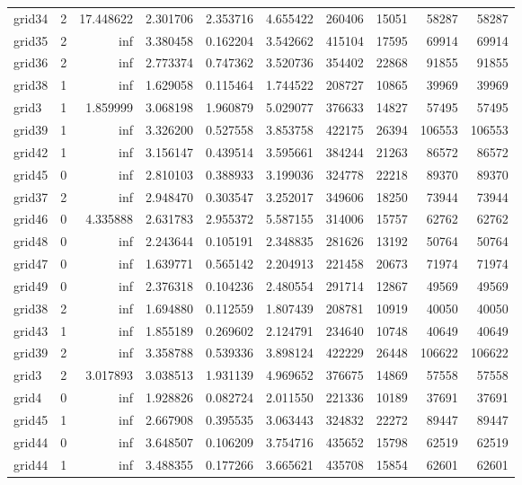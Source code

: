 \documentclass[../../../thesis.tex]{subfiles}
\begin{document}
\begin{longtable}{|l|r|r|r|r|r|r|r|r|r|}
grid34 & 2 & 17.448622 & 2.301706 & 2.353716 & 4.655422 & 260406 & 15051 & 58287 & 58287 \\
grid35 & 2 & inf & 3.380458 & 0.162204 & 3.542662 & 415104 & 17595 & 69914 & 69914 \\
grid36 & 2 & inf & 2.773374 & 0.747362 & 3.520736 & 354402 & 22868 & 91855 & 91855 \\
grid38 & 1 & inf & 1.629058 & 0.115464 & 1.744522 & 208727 & 10865 & 39969 & 39969 \\
grid3 & 1 & 1.859999 & 3.068198 & 1.960879 & 5.029077 & 376633 & 14827 & 57495 & 57495 \\
grid39 & 1 & inf & 3.326200 & 0.527558 & 3.853758 & 422175 & 26394 & 106553 & 106553 \\
grid42 & 1 & inf & 3.156147 & 0.439514 & 3.595661 & 384244 & 21263 & 86572 & 86572 \\
grid45 & 0 & inf & 2.810103 & 0.388933 & 3.199036 & 324778 & 22218 & 89370 & 89370 \\
grid37 & 2 & inf & 2.948470 & 0.303547 & 3.252017 & 349606 & 18250 & 73944 & 73944 \\
grid46 & 0 & 4.335888 & 2.631783 & 2.955372 & 5.587155 & 314006 & 15757 & 62762 & 62762 \\
grid48 & 0 & inf & 2.243644 & 0.105191 & 2.348835 & 281626 & 13192 & 50764 & 50764 \\
grid47 & 0 & inf & 1.639771 & 0.565142 & 2.204913 & 221458 & 20673 & 71974 & 71974 \\
grid49 & 0 & inf & 2.376318 & 0.104236 & 2.480554 & 291714 & 12867 & 49569 & 49569 \\
grid38 & 2 & inf & 1.694880 & 0.112559 & 1.807439 & 208781 & 10919 & 40050 & 40050 \\
grid43 & 1 & inf & 1.855189 & 0.269602 & 2.124791 & 234640 & 10748 & 40649 & 40649 \\
grid39 & 2 & inf & 3.358788 & 0.539336 & 3.898124 & 422229 & 26448 & 106622 & 106622 \\
grid3 & 2 & 3.017893 & 3.038513 & 1.931139 & 4.969652 & 376675 & 14869 & 57558 & 57558 \\
grid4 & 0 & inf & 1.928826 & 0.082724 & 2.011550 & 221336 & 10189 & 37691 & 37691 \\
grid45 & 1 & inf & 2.667908 & 0.395535 & 3.063443 & 324832 & 22272 & 89447 & 89447 \\
grid44 & 0 & inf & 3.648507 & 0.106209 & 3.754716 & 435652 & 15798 & 62519 & 62519 \\
grid44 & 1 & inf & 3.488355 & 0.177266 & 3.665621 & 435708 & 15854 & 62601 & 62601 \\

\end{longtable}
\end{document}
